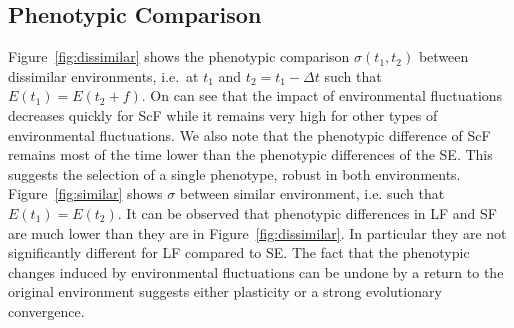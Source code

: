 \subsection{Phenotypic Comparison}

Figure~\ref{fig:dissimilar} shows the phenotypic comparison $\sigma(t_1, t_2)$ between dissimilar environments, i.e.~at $t_1$ and $t_2 = t_1 - \Delta t$ such that $E(t_1) = E(t_2 + f)$. On can see that the impact of environmental fluctuations decreases quickly for ScF while it remains very high for other types of environmental fluctuations. We also note that the phenotypic difference of ScF remains most of the time lower than the phenotypic differences of the SE. This suggests the selection of a single phenotype, robust in both environments. Figure~\ref{fig:similar} shows $\sigma$ between similar environment, i.e. such that $E(t_1) = E(t_2)$. It can be observed that phenotypic differences in LF and SF are much lower than they are in Figure~\ref{fig:dissimilar}. In particular they are not significantly different for LF compared to SE. The fact that the phenotypic changes induced by environmental fluctuations can be undone by a return to the original environment suggests either plasticity or a strong evolutionary convergence.

